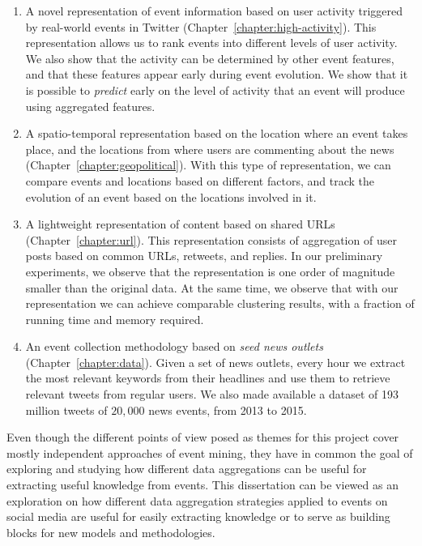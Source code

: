 \begin{enumerate}
    \setlength\itemsep{0.5em}

\item A novel representation of event information based on user activity
triggered by real-world events in Twitter (Chapter~\ref{chapter:high-activity}).
%
This representation allows us to rank events into different levels of user
activity. 
%
We also show that the activity can be determined by other event features, and
that these features appear early during event evolution.
%
We show that it is possible to {\em predict} early on the level of activity that
an event will produce using aggregated features.

\item A spatio-temporal representation based on the location where an event
takes place, and the locations from where users are commenting about the news
(Chapter~\ref{chapter:geopolitical}).
%
With this type of representation, we can compare events and locations based on
different factors, and track the evolution of an event based on the locations
involved in it.

\item A lightweight representation of content based on shared URLs
(Chapter~\ref{chapter:url}).
%
This representation consists of aggregation of user posts based on common URLs,
retweets, and replies. 
%
In our preliminary experiments, we observe that the representation is one order
of magnitude smaller than the original data.
%
At the same time, we observe that with our representation we can achieve
comparable clustering results, with a fraction of running time and memory
required.

\item An event collection methodology based on {\em seed news outlets}
(Chapter~\ref{chapter:data}).
%
Given a set of news outlets, every hour we extract the most relevant keywords
from their headlines and use them to retrieve relevant tweets from regular
users.
%
We also made available a dataset of 193 million tweets of $20,000$ news events,
from 2013 to 2015.
\end{enumerate}

Even though the different points of view posed as themes for this project cover
mostly independent approaches of event mining, they have in common the goal of
exploring and studying how different data aggregations can be useful for
extracting useful knowledge from events. 
%
This dissertation can be viewed as an exploration on how different data
aggregation strategies applied to events on social media are useful for easily
extracting knowledge or to serve as building blocks for new models and
methodologies.


